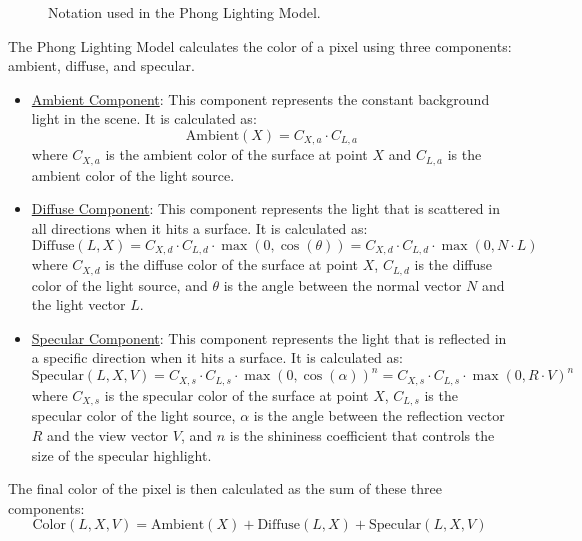 \begin{notacion}
\begin{figure}
    \caption{Notation used in the Phong Lighting Model.}
    \label{fig:phong-notation}
\end{figure}
\end{notacion}
The Phong Lighting Model calculates the color of a pixel using three components: ambient, diffuse, and specular.
\begin{itemize}
    \item \ul{Ambient Component}: This component represents the constant background light in the scene. It is calculated as:
    \begin{equation*}
        \text{Ambient}(X) = C_{X,a}\cdot C_{L,a}
    \end{equation*}
    where $C_{X,a}$ is the ambient color of the surface at point $X$ and $C_{L,a}$ is the ambient color of the light source.
    \item \ul{Diffuse Component}: This component represents the light that is scattered in all directions when it hits a surface. It is calculated as:
    \begin{equation*}
        \text{Diffuse}(L,X) = C_{X,d}\cdot C_{L,d} \cdot \max(0, \cos(\theta))= C_{X,d}\cdot C_{L,d} \cdot \max(0, N \cdot L)
    \end{equation*}
    where $C_{X,d}$ is the diffuse color of the surface at point $X$, $C_{L,d}$ is the diffuse color of the light source, and $\theta$ is the angle between the normal vector $N$ and the light vector $L$.
    \item \ul{Specular Component}: This component represents the light that is reflected in a specific direction when it hits a surface. It is calculated as:
    \begin{equation*}
        \text{Specular}(L,X,V) = C_{X,s}\cdot C_{L,s} \cdot \max(0, \cos(\alpha))^n = C_{X,s}\cdot C_{L,s} \cdot \max(0, R \cdot V)^n
    \end{equation*}
    where $C_{X,s}$ is the specular color of the surface at point $X$, $C_{L,s}$ is the specular color of the light source, $\alpha$ is the angle between the reflection vector $R$ and the view vector $V$, and $n$ is the shininess coefficient that controls the size of the specular highlight.
\end{itemize}
The final color of the pixel is then calculated as the sum of these three components:
\begin{equation*}
    \text{Color}(L,X,V) = \text{Ambient}(X) + \text{Diffuse}(L,X) + \text{Specular}(L,X,V)
\end{equation*}


